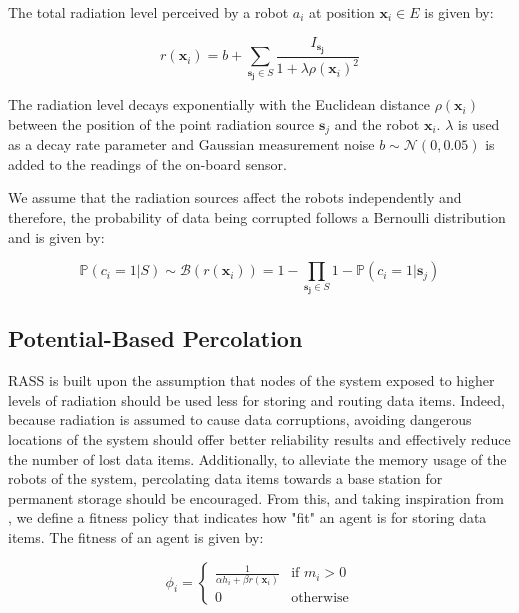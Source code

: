 The total radiation level perceived by a robot $a_i$ at position $\bm{x}_i \in E$ is given by:

\begin{equation}
    r(\bm{x}_i) = b + \sum_{\bm{s_j} \in S} \frac{I_{\bm{s_j}}}{1 + \lambda\rho(\bm{x}_i)^2}
    \label{eq:radiationRASS}
\end{equation}

The radiation level decays exponentially with the Euclidean distance $\rho(\bm{x}_i)$ between the position of the point radiation source $\bm{s}_j$ and the robot $\bm{x}_i$. $\lambda$ is used as a decay rate parameter and Gaussian measurement noise
$b \sim \mathcal{N}(0, 0.05)$ is added to the readings of the on-board sensor. 

We assume that the radiation sources affect the robots independently and therefore, the probability of data being corrupted follows a Bernoulli distribution and is given by:

\begin{equation}
    \mathbb{P}(c_i = 1 | S) \sim \mathcal{B}(r(\bm{x}_i)) = 1 - \prod_{\bm{s_j} \in S} 1 - \mathbb{P}(c_i = 1 | \bm{s}_j)
    \label{eq:failureRASS}
\end{equation}


\subsection{Potential-Based Percolation}

RASS is built upon the assumption that nodes of the system exposed to higher levels of radiation should be used less for storing and routing data items. Indeed, because radiation is assumed to cause data corruptions, avoiding dangerous locations of the system should offer better reliability results and effectively reduce the number of lost data items. Additionally, to alleviate the memory usage of the robots of the system, percolating data items towards a base station for permanent storage should be encouraged. From this, and taking inspiration from \cite{majcherczykSwarmmesh2020}, we define a fitness policy that indicates how "fit" an agent is for storing data items. The fitness of an agent is given by:

\begin{equation}
        \phi_i =
        \left\{ 
        \begin{array}{ll}
            \frac{1}{\alpha h_i + \beta r({\bm{x}_i})} &\text{if } m_i > 0 \\
            0 &\text{otherwise}
        \end{array} \right.
        \label{equation:fitness}
\end{equation}

